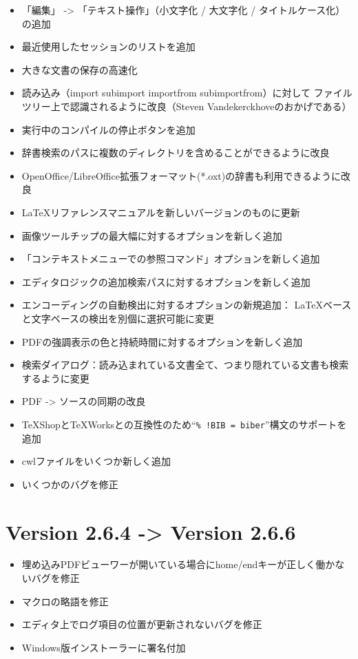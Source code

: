 \begin{itemize}
\item
  「編集」 -\textgreater{} 「テキスト操作」（小文字化 / 大文字化 / タイトルケース化）の追加
\item
  最近使用したセッションのリストを追加
\item
  大きな文書の保存の高速化
\item
  読み込み（import subimport importfrom subimportfrom）に対して
ファイルツリー上で認識されるように改良（Steven Vandekerckhoveのおかげである）
\item
  実行中のコンパイルの停止ボタンを追加
\item
  辞書検索のパスに複数のディレクトリを含めることができるように改良
\item
  OpenOffice/LibreOffice拡張フォーマット(*.oxt)の辞書も利用できるように改良
\item
  LaTeXリファレンスマニュアルを新しいバージョンのものに更新
\item
  画像ツールチップの最大幅に対するオプションを新しく追加
\item
  「コンテキストメニューでの参照コマンド」オプションを新しく追加
\item
  エディタロジックの追加検索パスに対するオプションを新しく追加
\item
  エンコーディングの自動検出に対するオプションの新規追加：
LaTeXベースと文字ベースの検出を別個に選択可能に変更
\item
  PDFの強調表示の色と持続時間に対するオプションを新しく追加
\item
  検索ダイアログ：読み込まれている文書全て、つまり隠れている文書も検索するように変更
\item
  PDF -\textgreater{} ソースの同期の改良
\item
  TeXShopとTeXWorksとの互換性のため``\verb+% !BIB = biber+''構文のサポートを追加
\item
  cwlファイルをいくつか新しく追加
\item
  いくつかのバグを修正
\end{itemize}

\section{Version 2.6.4 -\textgreater{} Version 2.6.6}

\begin{itemize}
\item
  埋め込みPDFビューワーが開いている場合にhome/endキーが正しく働かないバグを修正
\item
  マクロの略語を修正
\item
  エディタ上でログ項目の位置が更新されないバグを修正
\item
  Windows版インストーラーに署名付加
\end{itemize}

